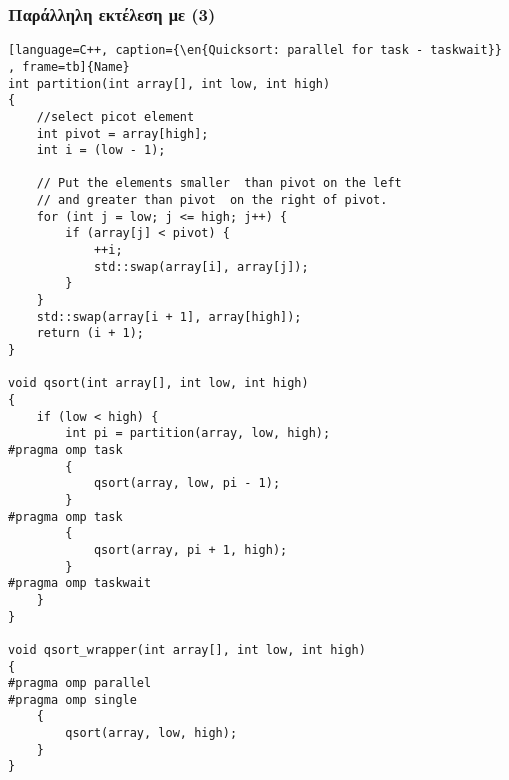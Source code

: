 \clearpage

\subsubsection{Παράλληλη εκτέλεση με  (3)}
\begin{spacing}{0.6}
\begin{lstlisting}[language=C++, caption={\en{Quicksort: parallel for task - taskwait}} , frame=tb]{Name}
int partition(int array[], int low, int high)
{
    //select picot element
    int pivot = array[high];
    int i = (low - 1);

    // Put the elements smaller  than pivot on the left
    // and greater than pivot  on the right of pivot.
    for (int j = low; j <= high; j++) {
        if (array[j] < pivot) {
            ++i;
            std::swap(array[i], array[j]);
        }
    }
    std::swap(array[i + 1], array[high]);
    return (i + 1);
}

void qsort(int array[], int low, int high)
{
    if (low < high) {
        int pi = partition(array, low, high);
#pragma omp task
        {
            qsort(array, low, pi - 1);
        }
#pragma omp task
        {
            qsort(array, pi + 1, high);
        }
#pragma omp taskwait
    }
}

void qsort_wrapper(int array[], int low, int high)
{
#pragma omp parallel
#pragma omp single
    {
        qsort(array, low, high);
    }
}
\end{lstlisting}
\end{spacing}

